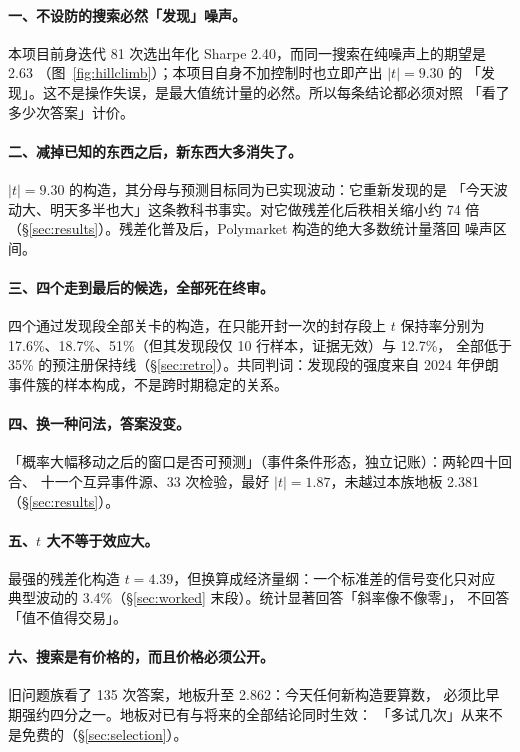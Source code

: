 \documentclass[11pt]{ctexart}
\begin{document}
\paragraph{一、不设防的搜索必然「发现」噪声。}
本项目前身迭代 81 次选出年化 Sharpe 2.40，而同一搜索在纯噪声上的期望是 2.63
（图~\ref{fig:hillclimb}）；本项目自身不加控制时也立即产出 $|t|=9.30$ 的
「发现」。这不是操作失误，是最大值统计量的必然。所以每条结论都必须对照
「看了多少次答案」计价。

\paragraph{二、减掉已知的东西之后，新东西大多消失了。}
$|t|=9.30$ 的构造，其分母与预测目标同为已实现波动：它重新发现的是
「今天波动大、明天多半也大」这条教科书事实。对它做残差化后秩相关缩小约 74 倍
（\S\ref{sec:results}）。残差化普及后，Polymarket 构造的绝大多数统计量落回
噪声区间。

\paragraph{三、四个走到最后的候选，全部死在终审。}
四个通过发现段全部关卡的构造，在只能开封一次的封存段上 $t$ 保持率分别为
17.6\%、18.7\%、51\%（但其发现段仅 10 行样本，证据无效）与 12.7\%，
全部低于 35\% 的预注册保持线（\S\ref{sec:retro}）。共同判词：发现段的强度来自
2024 年伊朗事件簇的样本构成，不是跨时期稳定的关系。

\paragraph{四、换一种问法，答案没变。}
「概率大幅移动之后的窗口是否可预测」（事件条件形态，独立记账）：两轮四十回合、
十一个互异事件源、33 次检验，最好 $|t|=1.87$，未越过本族地板
2.381（\S\ref{sec:results}）。

\paragraph{五、$t$ 大不等于效应大。}
最强的残差化构造 $t=4.39$，但换算成经济量纲：一个标准差的信号变化只对应
典型波动的 3.4\%（\S\ref{sec:worked} 末段）。统计显著回答「斜率像不像零」，
不回答「值不值得交易」。

\paragraph{六、搜索是有价格的，而且价格必须公开。}
旧问题族看了 135 次答案，地板升至 2.862：今天任何新构造要算数，
必须比早期强约四分之一。地板对已有与将来的全部结论同时生效：
「多试几次」从来不是免费的（\S\ref{sec:selection}）。
\end{document}
